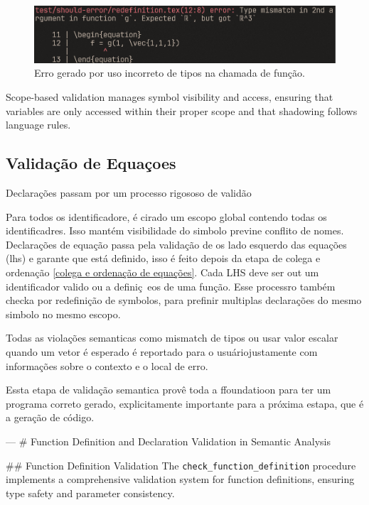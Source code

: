 \begin{figure}[H]
    \caption{\label{fig-type-mismatch} \small Erro gerado por uso incorreto de tipos na chamada de função.}
    \begin{center}
        \includegraphics[scale=0.5]{./Imagens/error-type-mismatch.png}
    \end{center}
\end{figure}

Scope-based validation manages symbol visibility and access, ensuring that variables are only accessed within their proper scope and that shadowing follows language rules.

\subsection{Validação de Equaçoes}
Declarações passam por um processo rigososo de validão

Para todos os identificadore, é cirado um escopo global contendo todas os identificadres. Isso mantém visibilidade do simbolo  previne conflito de nomes. Declarações de equação passa pela validação de os lado esquerdo das equações (lhs) e garante que está definido, isso é feito depois da etapa de colega e ordenação \autoref{colega e ordenação de equações}. Cada LHS deve ser out um identificador valido ou a definiç~eos de uma função. Esse processro também checka por redefinição de symbolos, para prefinir multiplas declarações do mesmo simbolo no mesmo escopo.


Todas as violações semanticas como mismatch de tipos ou usar valor escalar quando um vetor é esperado é reportado para o usuáriojustamente com informações sobre o contexto e o local de erro.


Essta etapa de validação semantica provê toda a ffoundatioon para ter um programa correto gerado, explicitamente importante para a próxima estapa, que é a geração de código. 

---
# Function Definition and Declaration Validation in Semantic Analysis

## Function Definition Validation
The \verb`check_function_definition` procedure implements a comprehensive validation system for function definitions, ensuring type safety and parameter consistency.

